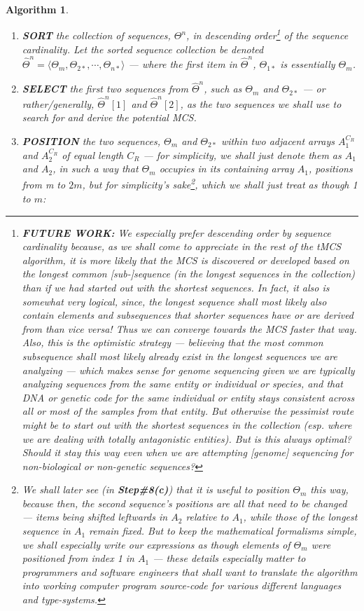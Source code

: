 \documentclass[a4paper, 18pt]{article} %
\newtheorem{alg}{Algorithm}
\begin{document}
\begin{alg}
\begin{enumerate}
{}
\item{
\textbf{SORT}  the collection of sequences, $\Theta^n$, in descending order\footnote{\textbf{FUTURE WORK:} We especially prefer descending order by sequence cardinality because, as we shall come to appreciate in the rest of the tMCS algorithm, it is more likely that the MCS is discovered or developed based on the longest  common [sub-]sequence (in the longest sequences in the collection) than if we had started out with the shortest sequences. In fact, it also is somewhat very logical, since, the longest sequence shall most likely also contain elements and subsequences that shorter sequences have or are derived from than vice versa! Thus we can converge towards the MCS faster that way. Also, this is \textit{the optimistic strategy} --- believing that the most common subsequence shall most likely already exist in the longest sequences we are analyzing --- which makes sense for genome sequencing given we are typically analyzing sequences from the same entity or individual or species, and that DNA or genetic code for the same individual or entity stays consistent across all or most of the samples from that entity. But otherwise the pessimist route might be to start out with the shortest sequences in the collection (esp. where we are dealing with totally antagonistic entities). But is this always optimal? Should it stay this way even when we are attempting [genome] sequencing for non-biological or non-genetic sequences?} of the sequence cardinality. Let the sorted sequence collection be denoted ${\hat{\Theta}}^n = \langle \Theta_m, \Theta_{2*}, \cdots , \Theta_{n*} \rangle$ --- where the first item in ${\hat{\Theta}}^n$, $\Theta_{1*}$ is essentially $\Theta_m$.
}
\item{
\textbf{SELECT}  the first two sequences from ${\hat{\Theta}}^n$, such as  $\Theta_m$ and $\Theta_{2*}$ --- or rather/generally, ${\hat{\Theta}}^n[1]$ and ${\hat{\Theta}}^n[2]$, as the two sequences we shall use to search for and derive the potential MCS.
}
\item { \textbf{POSITION} the two sequences, $\Theta_m$ and $\Theta_{2*}$ within two adjacent arrays $A_1^{C_R}$ and $A_2^{C_R}$ of equal length $C_R$ --- for simplicity, we shall just denote them as  $A_1$ and $A_2$, in such a way that $\Theta_m$ occupies in its containing array $A_1$, positions from m to $2m$, but for simplicity's sake\footnote{We shall later see (in \textbf{Step\#8(c)}) that it is useful to position $\Theta_m$ this way, because then, the second sequence's positions are all that need to be changed --- items being shifted leftwards in $A_2$ relative to $A_1$, while those of the longest sequence in $A_1$ remain fixed. But to keep the mathematical formalisms simple, we shall especially write our expressions as though elements of $\Theta_m$ were positioned from index 1 in $A_1$ --- these details especially matter to programmers and software engineers that shall want to translate the algorithm into working computer program source-code for various different languages and type-systems.}, which we shall just treat as though 1 to $m$:

}
\end{enumerate}
\end{alg}
\end{document}
